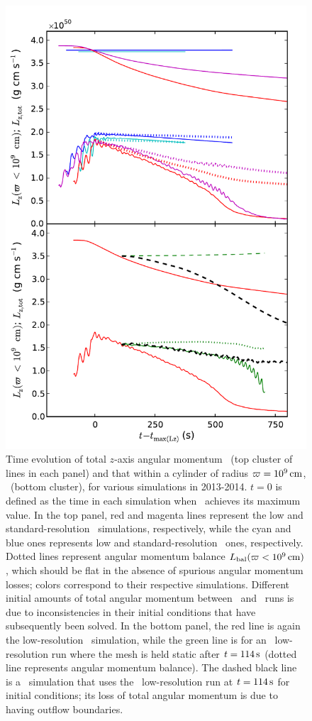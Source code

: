 \begin{figure}
\centering
\includegraphics[angle=0,width=0.6\columnwidth]{chapter3_zhu+u/figures/lz_development.pdf}
\caption{Time evolution of total $z$-axis angular momentum \Lztot\ (top cluster of lines in each panel) and that within a cylinder of radius $\varpi = 10^9\,\mathrm{cm}$, \Lzinner\ (bottom cluster), for various simulations in 2013-2014.  $t=0$ is defined as the time in each simulation when \Lzinner\ achieves its maximum value.  In the top panel, red and magenta lines represent the low and standard-resolution \arepo\ simulations, respectively, while the cyan and blue ones represents low and standard-resolution \gasoline\ ones, respectively.  Dotted lines represent angular momentum balance $\Lbal(\winnercyl)$, which should be flat in the absence of spurious angular momentum losses; colors correspond to their respective simulations.  Different initial amounts of total angular momentum between \arepo\ and \gasoline\ runs is due to inconsistencies in their initial conditions that have subsequently been solved.  In the bottom panel, the red line is again the low-resolution \arepo\ simulation, while the green line is for an \arepo\ low-resolution run where the mesh is held static after $t = 114\,\mathrm{s}$ (dotted line represents angular momentum balance).  The dashed black line is a \flash\ simulation that uses the \arepo\ low-resolution run at $t = 114\,\mathrm{s}$ for initial conditions; its loss of total angular momentum is due to having outflow boundaries.}
\label{fig:c3_fix_angmo}
\end{figure}

